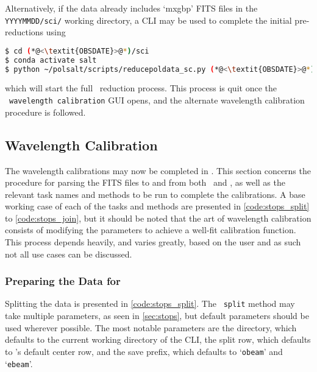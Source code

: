 Alternatively, if the data already includes `mxgbp' \gls{FITS} files in the \texttt{YYYYMMDD/sci/} working directory, a \gls{CLI} may be used to complete the initial pre-reductions using
\begin{lstlisting}[language=bash]
$ cd (*@<\textit{OBSDATE}>@*)/sci
$ conda activate salt
$ python ~/polsalt/scripts/reducepoldata_sc.py (*@<\textit{OBSDATE}>@*)
\end{lstlisting}
{\parskip=0pt which} will start the full \polsalt\ reduction process. This process is quit once the \polsalt\ \texttt{wavelength calibration} \gls{GUI} opens, and the alternate wavelength calibration procedure is followed.

\subsection{Wavelength Calibration} \label{subsec:reduc_wav}

The wavelength calibrations may now be completed in \iraf. This section concerns the procedure for parsing the \gls{FITS} files to and from both \iraf\ and \polsalt, as well as the relevant task names and methods to be run to complete the calibrations. A base working case of each of the tasks and methods are presented in \autoref{code:stops_split} to \ref{code:stops_join}, but it should be noted that the art of wavelength calibration consists of modifying the parameters to achieve a well-fit calibration function. This process depends heavily, and varies greatly, based on the user and as such not all use cases can be discussed.

\subsubsection{Preparing the Data for \iraf}

Splitting the data is presented in \autoref{code:stops_split}. The \stops\ \texttt{split} method may take multiple parameters, as seen in \autoref{sec:stops}, but default parameters should be used wherever possible. The most notable parameters are the directory, which defaults to the current working directory of the \gls{CLI}, the split row, which defaults to \polsalt's default center row, and the save prefix, which defaults to `\texttt{obeam}' and `\texttt{ebeam}'.

